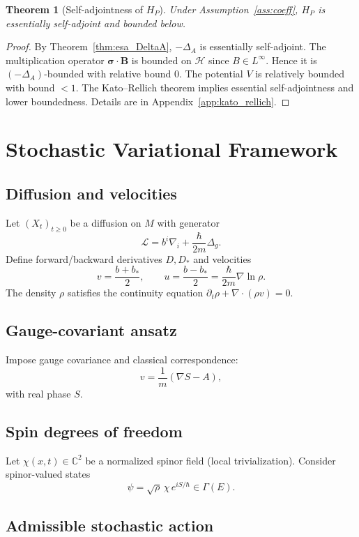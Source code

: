 \documentclass[11pt]{article}
\newtheorem{theorem}{Theorem}[section]
\begin{document}
\begin{theorem}[Self-adjointness of $H_P$]\label{thm:esa_pauli}
Under Assumption~\ref{ass:coeff}, $H_P$ is essentially self-adjoint and bounded below.
\end{theorem}

\begin{proof}
By Theorem~\ref{thm:esa_DeltaA}, $-\Delta_A$ is essentially self-adjoint. The multiplication operator $\bm{\sigma}\cdot\bm{B}$ is bounded on $\mathcal{H}$ since $B\in L^\infty$. Hence it is $(-\Delta_A)$-bounded with relative bound $0$. The potential $V$ is relatively bounded with bound $<1$. The Kato--Rellich theorem implies essential self-adjointness and lower boundedness. Details are in Appendix~\ref{app:kato_rellich}.
\end{proof}

\section{Stochastic Variational Framework}

\subsection{Diffusion and velocities}

Let $(X_t)_{t\ge 0}$ be a diffusion on $M$ with generator
\[
\mathcal{L} = b^i\nabla_i + \frac{\hbar}{2m}\Delta_g.
\]
Define forward/backward derivatives $D,D_*$ and velocities
\[
v=\frac{b+b_*}{2},\qquad u=\frac{b-b_*}{2}=\frac{\hbar}{2m}\nabla \ln \rho.
\]
The density $\rho$ satisfies the continuity equation $\partial_t\rho+\nabla\cdot(\rho v)=0$.

\subsection{Gauge-covariant ansatz}

Impose gauge covariance and classical correspondence:
\[
v=\frac{1}{m}(\nabla S - A),
\]
with real phase $S$.

\subsection{Spin degrees of freedom}

Let $\chi(x,t)\in \mathbb{C}^2$ be a normalized spinor field (local trivialization). Consider spinor-valued states
\[
\psi=\sqrt{\rho}\,\chi\,e^{iS/\hbar}\in \Gamma(E).
\]

\subsection{Admissible stochastic action}
\end{document}
